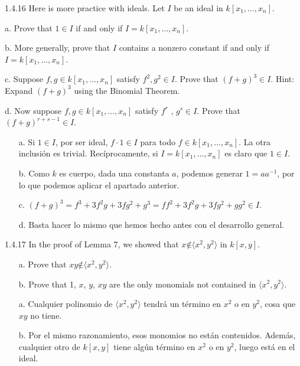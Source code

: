 \documentclass[twoside]{article}
\begin{document}
\begin{ejercicio}{1.4.16}
Here is more practice with ideals. Let $I$ be an ideal in $k[x_1,\dots , x_n]$.
\item[a.] Prove that $1 ∈ I$ if and only if $I = k[x_1,\dots , x_n]$.
\item[b.] More generally, prove that $I$ contains a nonzero constant if and only if $I = k[x_1,\dots, x_n]$.
\item[c.] Suppose $f , g ∈ k[x_1,\dots , x_n]$ satisfy $f^2, g^2 ∈ I$. Prove that $(f + g)^3 ∈ I$. Hint: Expand
$(f + g)^3$ using the Binomial Theorem.
\item[d.] Now suppose $f , g ∈ k[x_1,\dots , x_n]$ satisfy $f^r$ , $g^s ∈ I$. Prove that $(f + g)^{r+s−1} ∈ I$.
\end{ejercicio}
\begin{solucion}
\begin{itemize}
\item[]
\item[a.] Si $1\in I$, por ser ideal, $f\cdot 1\in I$ para todo $f\in k[x_1,\dots , x_n]$. La otra inclusión es trivial. Recíprocamente, si $I=k[x_1,\dotsc,x_n]$ es claro que $1\in I$.
\item[b.] Como $k$ es cuerpo, dada una constanta $a$, podemos generar $1=aa^{-1}$, por lo que podemos aplicar el apartado anterior.
\item[c.] $(f+g)^3=f^3+3f^2g+3fg^2+g^3=ff^2+3f^2g+3fg^2+gg^2\in I$. 
\item[d.] Basta hacer lo mismo que hemos hecho antes con el desarrollo general. 
\end{itemize}
\end{solucion}

\newpage

\begin{ejercicio}{1.4.17}
In the proof of Lemma 7, we showed that $x \not∈ 
\langle x^2, y^2\rangle$ in $k[x, y]$.
\begin{itemize}
\item[a.] Prove that $xy \not∈ 
\langle x^2, y^2\rangle$.
\item[b.] Prove that 1, $x$, $y$, $xy$ are the only monomials not contained in 
$\langle x^2, y^2\rangle$.
\end{itemize}
\end{ejercicio}
\begin{solucion}
\begin{itemize}
\item[]
\item[a.] Cualquier polinomio de $\langle x^2, y^2\rangle$ tendrá un término en $x^2$ o en $y^2$, cosa que $xy$ no tiene. 
\item[b.] Por el mismo razonamiento, esos monomios no están contenidos. Además, cualquier otro de $k[x,y]$ tiene algún término en $x^2$ o en $y^2$, luego está en el ideal. 
\end{itemize}
\end{solucion}
\end{document}
